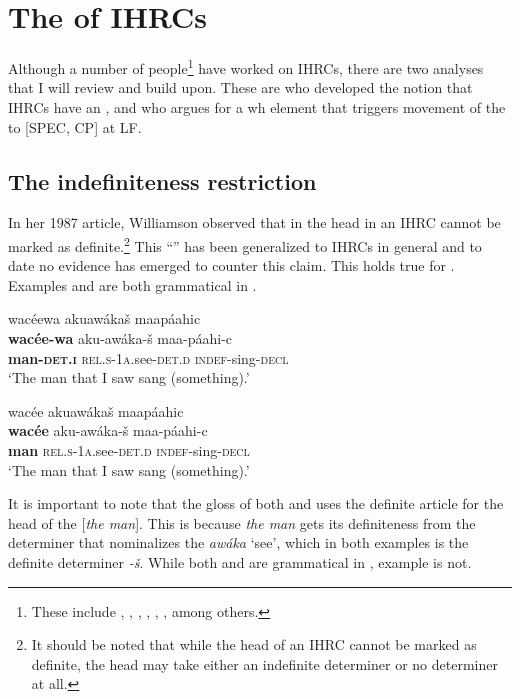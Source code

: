 \documentclass[output=paper]{LSP/langsci}
\begin{document}
\section{The  of IHRCs}\label{sec:boyle:4}

Although a number of people\footnote{These include \citet{HalePlatero1974}, \citet{Gorbet1976}, \citet{Fauconnier1979}, \citet{Cole1987}, \citet{Culy1990}, \citet{Kayne1994} \citet{Bianchi1999}, \citet{Citko2001} among others.} have worked on IHRCs, there are two analyses that I will review and build upon. These are \citet{Williamson1987} who developed the notion that IHRCs have an , and \citet{Culy1990} who argues for a wh element that triggers movement of the  to [SPEC, CP] at LF.

\subsection{The indefiniteness restriction}\label{sec:boyle:4.1}

In her 1987 article, Williamson observed that in  the head in an IHRC cannot be marked as definite.\footnote{It should be noted that while the head of an IHRC cannot be marked as definite, the head may take either an indefinite determiner or no determiner at all.} This ``'' has been generalized to IHRCs in general and to date no evidence has emerged to counter this claim. This  holds true for .  Examples  and  are both grammatical in .

\ea  \label{boyle13}
\glll wac\'eewa akuaw\'aka\v{s} maap\'aahic\\
\textbf{wac\'ee-wa}     aku-aw\'aka-\v{s}       maa-p\'aahi-c\\
\textbf{man-\textsc{det.i}} \textsc{rel.s-1a}.see-\textsc{det.d} \textsc{indef}-sing-\textsc{decl}\\ 
\trans `The man that I saw sang (something).' 
\z

\ea \label{boyle14}
\glll wac\'ee akuaw\'aka\v{s} maap\'aahic\\
\textbf{wac\'ee}  aku-aw\'aka-\v{s} maa-p\'aahi-c\\
\textbf{man} \textsc{rel.s-1a}.see-\textsc{det.d} \textsc{indef}-sing-\textsc{decl}\\
\trans `The man that I saw sang (something).' 
\z

It is important to note that the  gloss of both  and  uses the definite article for the head of the  [\textit{the man}]. This is because \textit{the man} gets its definiteness from the determiner that nominalizes the  \textit{aw\'aka} `see', which in both examples is the definite determiner \textit{-\v{s}}. While both  and  are grammatical in , example  is not.
\end{document}
